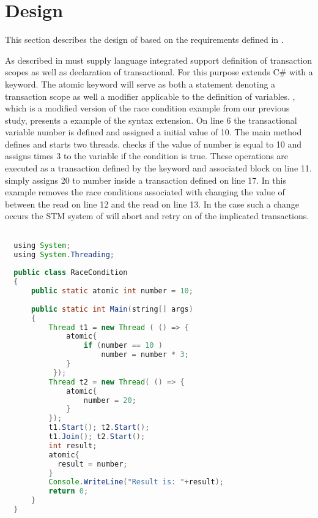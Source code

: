 

\section{Design}
\label{sec:stm_design}
This section describes the design of \stmnamesp based on the requirements defined in .

As described in  \stmnamesp must supply language integrated support definition of transaction scopes as well as declaration of transactional. For this purpose \stmnamesp extends C\# with a  keyword. The atomic keyword will serve as both a statement denoting a transaction scope as well a modifier applicable to the definition of variables. , which is a modified version of the race condition example from our previous study\cite[p. 23]{dpt907e14trending}, presents a example of the syntax extension. On line 6 the transactional variable number is defined and assigned a initial value of 10. The main method defines and starts two threads.  checks if the value of number is equal to 10 and assigns  times 3 to the variable if the condition is true. These operations are executed as a transaction defined by the  keyword and associated block on line 11.  simply assigns 20 to number inside a transaction defined on line 17. In this example \stmnamesp removes the race conditions associated with  changing the value of  between the read on line 12 and the read on line 13. In the case such a change occurs the \ac{STM} system of \stmnamesp will abort and retry on of the implicated transactions.
 
\begin{lstlisting}[label=lst:stm_atomic_syntax,
  caption={Transaction Syntax},
  language=Java,  
  showspaces=false,
  showtabs=false,
  breaklines=true,
  showstringspaces=false,
  breakatwhitespace=true,
  commentstyle=\color{greencomments},
  keywordstyle=\color{bluekeywords},
  stringstyle=\color{redstrings},
  morekeywords={atomic, retry, orElse, var, get, set, using}]  % Start your code-block

  using System;
  using System.Threading;
  
  public class RaceCondition
  {
      public static atomic int number = 10;
  
      public static int Main(string[] args)
      {
          Thread t1 = new Thread ( () => {
              atomic{
                  if (number == 10 )           
                      number = number * 3;
              }
           });
          Thread t2 = new Thread( () => {
              atomic{
                  number = 20;
              }
          });
          t1.Start(); t2.Start();
          t1.Join(); t2.Start();
          int result;
          atomic{
          	result = number;          
          }
          Console.WriteLine("Result is: "+result);
          return 0;
      }
  }
\end{lstlisting}

